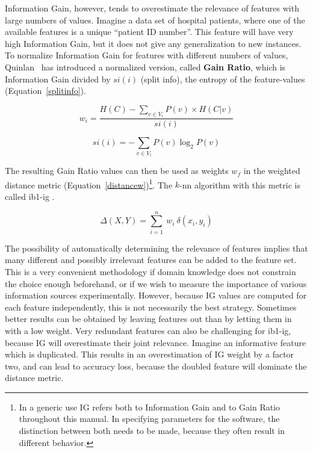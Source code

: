 \documentclass{report}
\begin{document}
Information Gain, however, tends to overestimate the relevance of
features with large numbers of values. Imagine a data set of hospital
patients, where one of the available features is a unique ``patient ID
number''. This feature will have very high Information Gain, but it
does not give any generalization to new instances. To normalize
Information Gain for features with different numbers of values,
Quinlan~\cite{Quinlan93} has introduced a normalized version, called
{\bf Gain Ratio}, which is Information Gain divided by $si(i)$ (split info),
the entropy of the feature-values (Equation~\ref{splitinfo}).

\begin{equation}
w_{i} = \frac{H(C) -  \sum_{v \in V_{i}} P(v) \times H(C|v)}{si(i)}
\label{IGgainratio}
\end{equation}

\begin{equation}
si(i) = - \sum_{v \in V_{i}} P(v) \log_{2} P(v)
\label{splitinfo}
\end{equation}

The resulting Gain Ratio values can then be used as weights $w_{f}$ in
the weighted distance metric (Equation~\ref{distancew})\footnote{In a
generic use IG refers both to Information Gain and to Gain Ratio
throughout this manual. In specifying parameters for the software, the
distinction between both needs to be made, because they often result
in different behavior.}. The $k$-{\sc nn} algorithm with this
metric is called {\sc ib1-ig} \cite{Daelemans+92b}.

\begin{equation}
\Delta(X,Y) = \sum_{i=1}^{n}\ w_{i} \ \delta(x_{i},y_{i})
\label{distancew}
\end{equation} 

The possibility of automatically determining the relevance of features
implies that many different and possibly irrelevant features can be
added to the feature set. This is a very convenient methodology if
domain knowledge does not constrain the choice enough beforehand, or
if we wish to measure the importance of various information sources
experimentally. However, because IG values are computed for each
feature independently, this is not necessarily the best
strategy. Sometimes better results can be obtained by leaving features
out than by letting them in with a low weight. Very redundant features
can also be challenging for {\sc ib1-ig}, because IG will overestimate
their joint relevance. Imagine an informative feature which is
duplicated. This results in an overestimation of IG weight by a factor
two, and can lead to accuracy loss, because the doubled feature will
dominate the distance metric.
\end{document}
